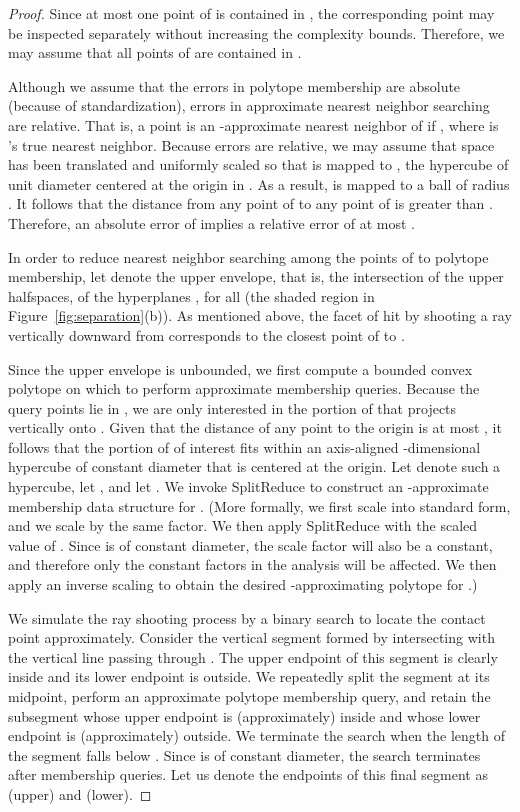 \documentclass[11pt]{article}   \usepackage[letterpaper,hmargin=2.1cm,vmargin=3cm]{geometry}
\newcommand{\alg}{\textrm{SplitReduce}}
\begin{document}
\begin{proof}
Since at most one point of  is contained in , the corresponding point may be inspected separately without increasing the complexity bounds. Therefore, we may assume that all points of  are contained in . 

Although we assume that the errors in polytope membership are absolute (because of standardization), errors in approximate nearest neighbor searching are relative. That is, a point  is an -approximate nearest neighbor of  if , where  is 's true nearest neighbor. Because errors are relative, we may assume that space has been translated and uniformly scaled so that  is mapped to , the hypercube of unit diameter centered at the origin in . As a result,  is mapped to a ball of radius . It follows that the distance from any point of  to any point of  is greater than . Therefore, an absolute error of  implies a relative error of at most .

In order to reduce nearest neighbor searching among the points of  to polytope membership, let  denote the upper envelope, that is, the intersection of the upper halfspaces, of the hyperplanes , for all  (the shaded region in Figure~\ref{fig:separation}(b)). As mentioned above, the facet of  hit by shooting a ray vertically downward from  corresponds to the closest point of  to . 

Since the upper envelope is unbounded, we first compute a bounded convex polytope on which to perform approximate membership queries. Because the query points lie in , we are only interested in the portion of  that projects vertically onto . Given that the distance of any point  to the origin is at most , it follows that the portion of  of interest fits within an axis-aligned -dimensional hypercube of constant diameter that is centered at the origin. Let  denote such a hypercube, let , and let . We invoke {\alg} to construct an -approximate membership data structure for . (More formally, we first scale  into standard form, and we scale  by the same factor. We then apply {\alg} with the scaled value of . Since  is of constant diameter, the scale factor will also be a constant, and therefore only the constant factors in the analysis will be affected. We then apply an inverse scaling to obtain the desired -approximating polytope for .)

We simulate the ray shooting process by a binary search to locate the contact point approximately. Consider the vertical segment formed by intersecting  with the vertical line passing through . The upper endpoint of this segment is clearly inside  and its lower endpoint is outside. We repeatedly split the segment at its midpoint, perform an approximate polytope membership query, and retain the subsegment whose upper endpoint is (approximately) inside  and whose lower endpoint is (approximately) outside. We terminate the search when the length of the segment falls below . Since  is of constant diameter, the search terminates after  membership queries. Let us denote the endpoints of this final segment as  (upper) and  (lower).


\end{proof}
\end{document}
